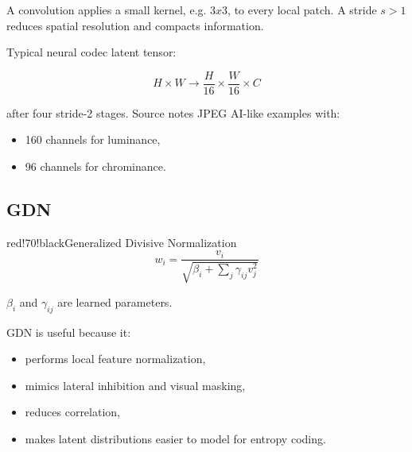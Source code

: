 \begin{center}
\end{center}

A convolution applies a small kernel, e.g. $3x3$, to every local patch. A stride $s>1$ reduces spatial resolution and compacts information.

Typical neural codec latent tensor:

\[
H\times W \rightarrow \frac{H}{16}\times\frac{W}{16}\times C
\]

after four stride-2 stages. Source notes JPEG AI-like examples with:

\begin{itemize}
  \item 160 channels for luminance,
  \item 96 channels for chrominance.
\end{itemize}

\subsection{GDN}

\begin{calloutbox}{red!70!black}{Generalized Divisive Normalization}
\[
w_i=
\frac{v_i}
{\sqrt{\beta_i+\sum_j\gamma_{ij}v_j^2}}
\]

$\beta_i$ and $\gamma_{ij}$ are learned parameters.
\end{calloutbox}

GDN is useful because it:

\begin{itemize}
  \item performs local feature normalization,
  \item mimics lateral inhibition and visual masking,
  \item reduces correlation,
  \item makes latent distributions easier to model for entropy coding.
\end{itemize}

